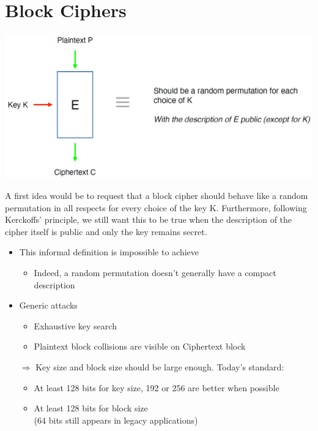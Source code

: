 \section{Block Ciphers}
	\begin{center}
		\includegraphics[width=140mm]{Graphics/Cryptanalysis/c1.png}
	\end{center}
	A first idea would be to request that a block cipher should behave like a random permutation in all respects for every choice of the key K. 
	Furthermore, following Kerckoffs’ principle, we still want this to be true when the description of the cipher itself is public and only the key remains secret.
	\begin{itemize}
		\item This informal definition is impossible to achieve
		\begin{itemize}
			\item Indeed, a random permutation doesn’t generally have a compact description
		\end{itemize}
		\item Generic attacks
		\begin{itemize}
			\item Exhaustive key search
			\item Plaintext block collisions are visible on Ciphertext block
		\end{itemize}
		\item[$\Rightarrow$] Key size and block size should be large enough. Today’s standard:
		\begin{itemize}
			\item At least 128 bits for key size, 192 or 256 are better when possible
			\item At least 128 bits for block size\\
			(64 bits still appears in legacy applications)
		\end{itemize}
	\end{itemize}

